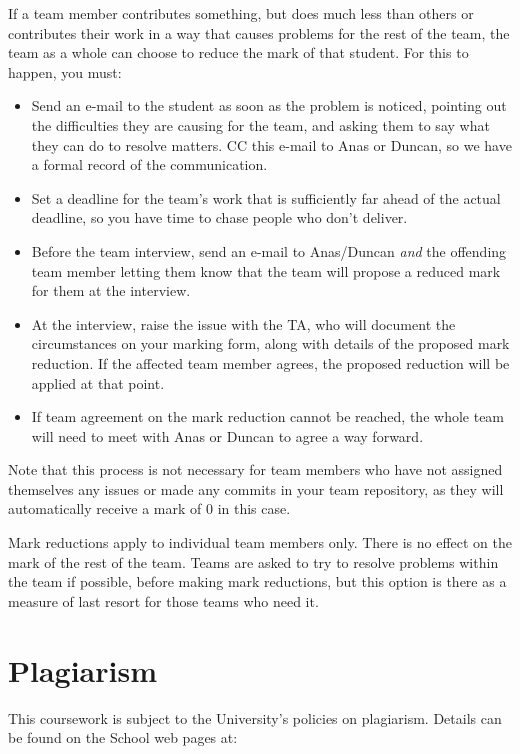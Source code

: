 \documentclass[
]{book}
\providecommand{\tightlist}{%
  \setlength{\itemsep}{0pt}\setlength{\parskip}{0pt}}
\begin{document}
If a team member contributes something, but does much less than others or contributes their work in a way that causes problems for the rest of the team, the team as a whole can choose to reduce the mark of that student. For this to happen, you must:

\begin{itemize}
\tightlist
\item
  Send an e-mail to the student as soon as the problem is noticed, pointing out the difficulties they are causing for the team, and asking them to say what they can do to resolve matters. CC this e-mail to Anas or Duncan, so we have a formal record of the communication.
\item
  Set a deadline for the team's work that is sufficiently far ahead of the actual deadline, so you have time to chase people who don't deliver.
\item
  Before the team interview, send an e-mail to Anas/Duncan \emph{and} the offending team member letting them know that the team will propose a reduced mark for them at the interview.
\item
  At the interview, raise the issue with the TA, who will document the circumstances on your marking form, along with details of the proposed mark reduction. If the affected team member agrees, the proposed reduction will be applied at that point.
\item
  If team agreement on the mark reduction cannot be reached, the whole team will need to meet with Anas or Duncan to agree a way forward.
\end{itemize}

Note that this process is not necessary for team members who have not assigned themselves any issues or made any commits in your team repository, as they will automatically receive a mark of 0 in this case.

Mark reductions apply to individual team members only. There is no effect on the mark of the rest of the team. Teams are asked to try to resolve problems within the team if possible, before making mark reductions, but this option is there as a measure of last resort for those teams who need it.

\hypertarget{copycats}{%
\section{Plagiarism}\label{copycats}}

This coursework is subject to the University's policies on plagiarism. Details can be found on the School web pages at:
\end{document}
